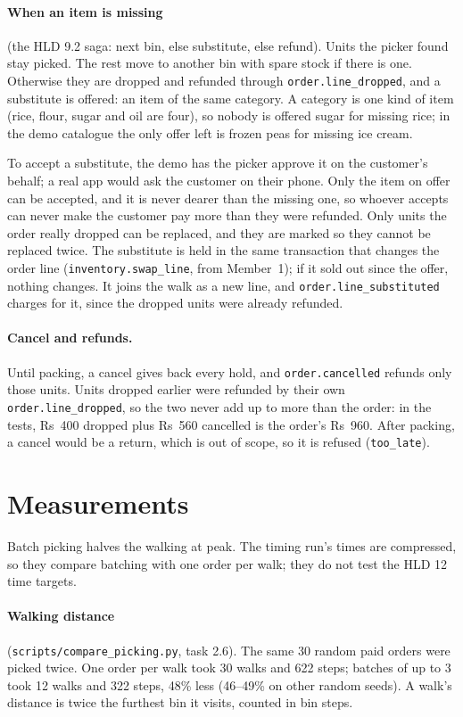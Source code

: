 \paragraph{When an item is missing} (the HLD 9.2 saga: next bin, else substitute, else refund). Units the picker
found stay picked. The rest move to another bin with spare stock if there is one. Otherwise they are dropped and
refunded through \texttt{order.line\_dropped}, and a substitute is offered: an item of the same category. A category
is one kind of item (rice, flour, sugar and oil are four), so nobody is offered sugar for missing rice; in the demo
catalogue the only offer left is frozen peas for missing ice cream.

To accept a substitute, the demo has the picker approve it on the customer's behalf; a real app would ask the
customer on their phone. Only the item on offer can be accepted, and it is never dearer than the missing one, so
whoever accepts can never make the customer pay more than they were refunded. Only units the order really dropped
can be replaced, and they are marked so they cannot be
replaced twice. The substitute is held in the same transaction that changes the order line
(\texttt{inventory.swap\_line}, from Member~1); if it sold out since the offer, nothing changes. It joins the walk as
a new line, and \texttt{order.line\_substituted} charges for it, since the dropped units were already refunded.

\paragraph{Cancel and refunds.} Until packing, a cancel gives back every hold, and \texttt{order.cancelled} refunds
only those units. Units dropped earlier were refunded by their own \texttt{order.line\_dropped}, so the two never add up
to more than the order: in the tests, Rs~400 dropped plus Rs~560 cancelled is the order's Rs~960. After packing, a
cancel would be a return, which is out of scope, so it is refused (\texttt{too\_late}).

\section{Measurements}

Batch picking halves the walking at peak. The timing run's times are compressed, so they compare batching with
one order per walk; they do not test the HLD 12 time targets.

\paragraph{Walking distance} (\texttt{scripts/compare\_picking.py}, task 2.6). The same 30 random paid orders were
picked twice. One order per walk took 30 walks and 622 steps; batches of up to 3 took 12 walks and 322 steps, 48\%
less (46--49\% on other random seeds). A walk's distance is twice the furthest bin it visits, counted in bin steps.

